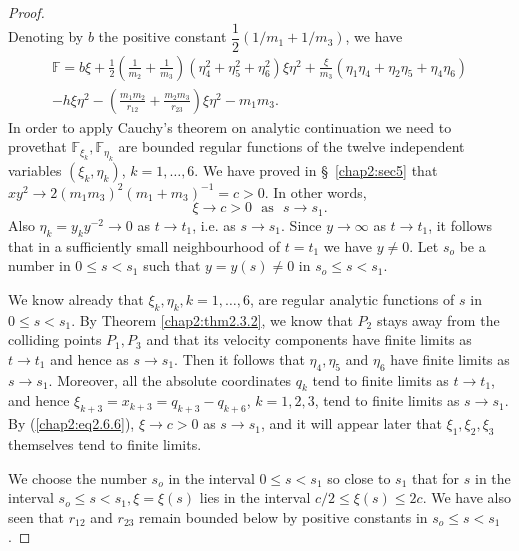 \begin{proof}
$$$$
Denoting by $b$ the positive constant $\dfrac{1}{2} (1/m_1 + 1/m_3) $, we have 
\begin{gather*}
\mathbb{F} = b \xi + \frac{1}{2} \left(\frac{1}{m_2} +\frac{1}{m_3} \right) \left(\eta^2_4 + \eta^2_5 + \eta^2_6 \right) \xi \eta^2 + \frac{\xi}{m_3} \left(\eta_1 \eta_4 + \eta_2 \eta_5 + \eta_4 \eta_6 \right) \\
- h \xi \eta^2 - \left(\frac{m_1 m_2}{r_{12}} + \frac{m_2 m_3}{r_{23}} \right) \xi \eta^2 - m_1 m_3. \tag{2.6.5}\label{chap2:eq2.6.5} 
\end{gather*}
In order to apply Cauchy's theorem on analytic continuation we need to prove\pageoriginale that $\mathbb{F}_{\xi_k}, \mathbb{F}_{\eta_k}$ are bounded regular functions of the twelve independent variables $(\xi_k, \eta_k)$, $k = 1, \ldots, 6$. We have proved in \S\ \ref{chap2:sec5} that $xy^2 \to 2 (m_1 m_3)^2 (m_1+ m_3)^{-1} = c>0$. In other words,
\begin{equation*}
\xi \to c > 0 \text{~ as ~} s \to s_1. \tag{2.6.6}\label{chap2:eq2.6.6} 
\end{equation*}
Also $\eta_k = y_k y^{-2} \to 0$ as $t \to t_1 $, i.e. as $s \to s_1$. Since $y \to \infty$ as $t \to t_1$, it follows that in a sufficiently small neighbourhood of $t = t_1$ we have $y \neq 0$. Let $s_o$ be a number in $0 \leq s <s_1$ such that $y = y(s) \neq 0$ in $s_o \leq s < s_1$. 

We know already that $\xi_k, \eta_k, k = 1, \ldots, 6$, are regular analytic functions of $s$ in $0 \leq s <s_1$. By Theorem \ref{chap2:thm2.3.2}, we know that $P_2$ stays away from the colliding points  $P_1, P_3$ and that its velocity components have finite limits as $t \to t_1$ and hence as $s \to s_1$. Then it follows that $\eta_4, \eta_5$ and $\eta_6$ have finite limits as $s \to s_1$. Moreover, all the absolute coordinates $q_k$ tend to finite limits as $t \to t_1$, and hence $\xi_{k+3} = x_{k+3} = q_{k+3} - q_{k+6}$, $k = 1,2,3$, tend to finite limits as $s \to s_1$. By (\ref{chap2:eq2.6.6}), $\xi \to c>0$ as $s \to s_1$, and it will appear later that $\xi_1, \xi_2, \xi_3$ themselves tend to finite limits.

We choose the number $s_o$ in the interval $0 \leq s < s_1$ so close to $s_1$ that for $s$ in the interval $s_o \leq s < s_1 , \xi = \xi (s)$ lies in the interval $c/2 \leq \xi (s) \leq 2c$. We have also seen that $r_{12}$ and $r_{23}$ remain bounded below by positive constants in $s_o \leq s < s_1$.


\end{proof}
